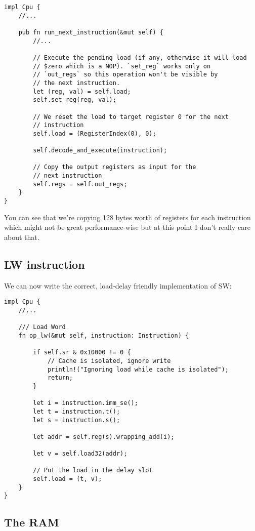 \documentclass[a4paper]{article}
\begin{document}
\begin{lstlisting}
impl Cpu {
    //...

    pub fn run_next_instruction(&mut self) {
        //...

        // Execute the pending load (if any, otherwise it will load
        // $zero which is a NOP). `set_reg` works only on
        // `out_regs` so this operation won't be visible by
        // the next instruction.
        let (reg, val) = self.load;
        self.set_reg(reg, val);

        // We reset the load to target register 0 for the next
        // instruction
        self.load = (RegisterIndex(0), 0);

        self.decode_and_execute(instruction);

        // Copy the output registers as input for the
        // next instruction
        self.regs = self.out_regs;
    }
}
\end{lstlisting}

You can see that we're copying 128 bytes worth of registers for each
instruction which might not be great performance-wise but at this
point I don't really care about that.

\subsection{LW instruction}

We can now write the correct, load-delay friendly implementation of
SW:

\begin{lstlisting}
impl Cpu {
    //...

    /// Load Word
    fn op_lw(&mut self, instruction: Instruction) {

        if self.sr & 0x10000 != 0 {
            // Cache is isolated, ignore write
            println!("Ignoring load while cache is isolated");
            return;
        }

        let i = instruction.imm_se();
        let t = instruction.t();
        let s = instruction.s();

        let addr = self.reg(s).wrapping_add(i);

        let v = self.load32(addr);

        // Put the load in the delay slot
        self.load = (t, v);
    }
}
\end{lstlisting}

\subsection{The RAM}
\end{document}
